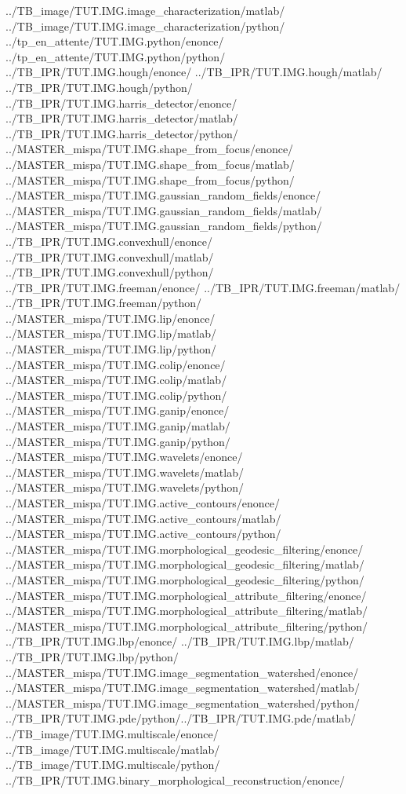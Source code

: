 {  {../TB_image/TUT.IMG.image_characterization/matlab/}
  {../TB_image/TUT.IMG.image_characterization/python/}
  {../tp_en_attente/TUT.IMG.python/enonce/}
  {../tp_en_attente/TUT.IMG.python/python/}
  {../TB_IPR/TUT.IMG.hough/enonce/}
  {../TB_IPR/TUT.IMG.hough/matlab/}
  {../TB_IPR/TUT.IMG.hough/python/}
  {../TB_IPR/TUT.IMG.harris_detector/enonce/}
  {../TB_IPR/TUT.IMG.harris_detector/matlab/}
  {../TB_IPR/TUT.IMG.harris_detector/python/}
  {../MASTER_mispa/TUT.IMG.shape_from_focus/enonce/}
  {../MASTER_mispa/TUT.IMG.shape_from_focus/matlab/}
  {../MASTER_mispa/TUT.IMG.shape_from_focus/python/}
  {../MASTER_mispa/TUT.IMG.gaussian_random_fields/enonce/}
  {../MASTER_mispa/TUT.IMG.gaussian_random_fields/matlab/}
  {../MASTER_mispa/TUT.IMG.gaussian_random_fields/python/}
  {../TB_IPR/TUT.IMG.convexhull/enonce/}
  {../TB_IPR/TUT.IMG.convexhull/matlab/}
  {../TB_IPR/TUT.IMG.convexhull/python/}
  {../TB_IPR/TUT.IMG.freeman/enonce/}  {../TB_IPR/TUT.IMG.freeman/matlab/} {../TB_IPR/TUT.IMG.freeman/python/}
  {../MASTER_mispa/TUT.IMG.lip/enonce/}
  {../MASTER_mispa/TUT.IMG.lip/matlab/}
  {../MASTER_mispa/TUT.IMG.lip/python/}
  {../MASTER_mispa/TUT.IMG.colip/enonce/}
  {../MASTER_mispa/TUT.IMG.colip/matlab/}
  {../MASTER_mispa/TUT.IMG.colip/python/}
  {../MASTER_mispa/TUT.IMG.ganip/enonce/}
  {../MASTER_mispa/TUT.IMG.ganip/matlab/}
  {../MASTER_mispa/TUT.IMG.ganip/python/}
  {../MASTER_mispa/TUT.IMG.wavelets/enonce/}
  {../MASTER_mispa/TUT.IMG.wavelets/matlab/}
  {../MASTER_mispa/TUT.IMG.wavelets/python/}
  {../MASTER_mispa/TUT.IMG.active_contours/enonce/}
  {../MASTER_mispa/TUT.IMG.active_contours/matlab/}
  {../MASTER_mispa/TUT.IMG.active_contours/python/}
  {../MASTER_mispa/TUT.IMG.morphological_geodesic_filtering/enonce/}
  {../MASTER_mispa/TUT.IMG.morphological_geodesic_filtering/matlab/}
  {../MASTER_mispa/TUT.IMG.morphological_geodesic_filtering/python/}
  {../MASTER_mispa/TUT.IMG.morphological_attribute_filtering/enonce/}
  {../MASTER_mispa/TUT.IMG.morphological_attribute_filtering/matlab/}
  {../MASTER_mispa/TUT.IMG.morphological_attribute_filtering/python/}
  {../TB_IPR/TUT.IMG.lbp/enonce/}  
  {../TB_IPR/TUT.IMG.lbp/matlab/} 
  {../TB_IPR/TUT.IMG.lbp/python/}  
  {../MASTER_mispa/TUT.IMG.image_segmentation_watershed/enonce/}
  {../MASTER_mispa/TUT.IMG.image_segmentation_watershed/matlab/}
  {../MASTER_mispa/TUT.IMG.image_segmentation_watershed/python/}
  {../TB_IPR/TUT.IMG.pde/python/}{../TB_IPR/TUT.IMG.pde/matlab/}
  {../TB_image/TUT.IMG.multiscale/enonce/}
  {../TB_image/TUT.IMG.multiscale/matlab/}
  {../TB_image/TUT.IMG.multiscale/python/}
  {../TB_IPR/TUT.IMG.binary_morphological_reconstruction/enonce/}
}

